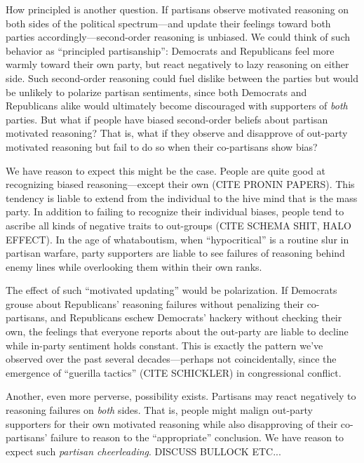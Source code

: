 \documentclass[12pt, letterpaper]{article}
\begin{document}
{How principled is another question. If partisans observe motivated reasoning on both sides of the political spectrum---and update their feelings toward both parties accordingly---second-order reasoning is unbiased. We could think of such behavior as ``principled partisanship'': Democrats and Republicans feel more warmly toward their own party, but react negatively to lazy reasoning on either side. Such second-order reasoning could fuel dislike between the parties but would be unlikely to polarize partisan sentiments, since both Democrats and Republicans alike would ultimately become discouraged with supporters of \emph{both} parties. But what if people have biased second-order beliefs about partisan motivated reasoning? That is, what if they observe and disapprove of out-party motivated reasoning but fail to do so when their co-partisans show bias?

We have reason to expect this might be the case. People are quite good at recognizing biased reasoning---except their own (CITE PRONIN PAPERS). This tendency is liable to extend from the individual to the hive mind that is the mass party. In addition to failing to recognize their individual biases, people tend to ascribe all kinds of negative traits to out-groups (CITE SCHEMA SHIT, HALO EFFECT). In the age of whataboutism, when ``hypocritical'' is a routine slur in partisan warfare, party supporters are liable to see failures of reasoning behind enemy lines while overlooking them within their own ranks.

The effect of such ``motivated updating'' would be polarization. If Democrats grouse about Republicans' reasoning failures without penalizing their co-partisans, and Republicans eschew Democrats' hackery without checking their own, the feelings that everyone reports about the out-party are liable to decline while in-party sentiment holds constant. This is exactly the pattern we've observed over the past several decades---perhaps not coincidentally, since the emergence of ``guerilla tactics'' (CITE SCHICKLER) in congressional conflict.

Another, even more perverse, possibility exists. Partisans may react negatively to reasoning failures on \emph{both} sides. That is, people might malign out-party supporters for their own motivated reasoning while also disapproving of their co-partisans' failure to reason to the ``appropriate'' conclusion. We have reason to expect such \emph{partisan cheerleading}. DISCUSS BULLOCK ETC...



}
\end{document}

